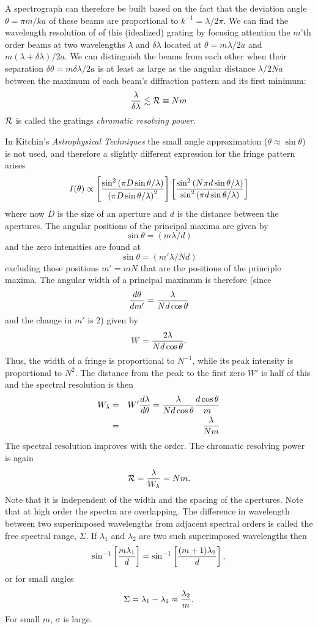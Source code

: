 \documentclass{article}
\newcommand{\bua}{\begin{eqnarray*}}
\newcommand{\eua}{\end{eqnarray*}}
\def\cl#1{{\cal #1}}               %
\begin{document}
A spectrograph can therefore be built based on the fact that the deviation angle $\theta={\pi m/ka}$ of these beams are proportional to $k^{-1}={\lambda/2\pi}$.
We can find the wavelength resolution of of this (idealized) grating by focusing attention
the $m$'th order beams at two wavelengths $\lambda$ and $\delta\lambda$ located
at $\theta={m\lambda/2a}$ and $m(\lambda+\delta\lambda)/2a$. We can distinguish
the beams from each other when their separation $\delta\theta={m\delta\lambda/2a}$
is at least as large as the angular distance ${\lambda/2Na}$ between the maximum
of each beam's diffraction pattern and its first minimum:
\[ 
{\lambda\over\delta\lambda}\lesssim\cl{R}\equiv Nm
\]
$\cl{R}$ is called the gratings {\it chromatic resolving power}.

In Kitchin's {\it Astrophysical Techniques} the small angle approximation 
($\theta\approx\sin\theta$) is not used, and therefore a slightly different expression for the fringe pattern arises
\[
I(\theta)\propto\left[{\sin^2\left({\pi D\sin\theta/\lambda}\right) 
               \over\left({\pi D\sin\theta/\lambda}\right)^2}\right]
                 \left[{\sin^2\left({N\pi d\sin\theta/\lambda}\right) 
               \over\sin^2\left({\pi d\sin\theta/\lambda}\right)}\right]
\]
where now $D$ is the size of an aperture and $d$ is the distance between the apertures.
The angular positions of the principal maxima are given by
\[
\sin\theta=({m\lambda/d})
\]
and the zero intensities are found at 
\[
\sin\theta=({m'\lambda/Nd})
\]
excluding those positions $m'=mN$ that are the positions of the principle maxima.
The angular width of a principal maximum is therefore (since 
\[ {d\theta\over dm'}={\lambda\over Nd\cos\theta}\]
and the change in $m'$ is 2) given by
\[ W={2\lambda\over Nd\cos\theta}. \]
Thus, the width of a fringe is proportional to $N^{-1}$, while its peak intensity is proportional to $N^2$. The distance from the peak to the first zero $W'$ is half of 
this and the spectral resolution is then
\bua
W_\lambda&=&W'{d\lambda\over d\theta}
 ={\lambda\over Nd\cos\theta}{d\cos\theta\over m} \\
&=&{\lambda\over Nm}
\eua
The spectral resolution improves with the order. The chromatic resolving power is again
\[\cl{R}={\lambda\over W_\lambda}=Nm.\]
Note that it is independent of the width and the spacing of the apertures. Note that at high order the spectra are overlapping. The difference in wavelength between two superimposed wavelengths from adjacent spectral orders is called the free spectral 
range, $\Sigma$. If $\lambda_1$ and $\lambda_2$ are two such superimposed 
wavelengths then
\[ \sin^{-1}\left[{m\lambda_1\over d}\right]=\sin^{-1}\left[{(m+1)\lambda_2\over d}\right],\]
or for small angles
\[ \Sigma=\lambda_1-\lambda_2\approx{\lambda_2\over m}. \]
For small $m$, $\sigma$ is large. 
\end{document}
